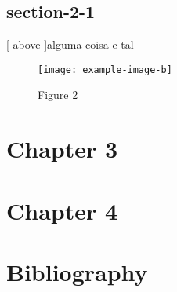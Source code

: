 \documentclass{book}
\begin{document}
\section{section-2-1}

\clearpage{}
[ above ]{alguma coisa e tal}


\begin{figure}[hb]
  \centering
  \caption{Figure 2}
  \texttt{[image: example-image-b]}
\end{figure}


\hyperlink{figure.2.1}{}

\chapter{Chapter 3}

\econ[3]





\chapter{Chapter 4}

\econ[4]




\backmatter



\chapter{Bibliography}
\end{document}
